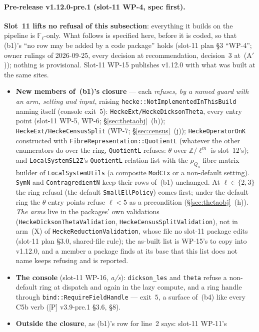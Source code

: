 \documentclass[11pt]{article}
\theoremstyle{remark}
\newcommand{\F}{\mathbb{F}}
\newcommand{\Z}{\mathbb{Z}}
\newcommand{\Fl}{\F_\ell}
\begin{document}
\paragraph{Pre-release v1.12.0-pre.1 (slot-11 WP-4, spec first).} \textbf{Slot~11 lifts no
refusal of this subsection}: everything it builds on the pipeline is $\Fl$-only. What follows is
specified here, before it is coded, so that (b1)'s ``no row may be added by a code package'' holds
(slot-11 plan \S3 ``WP-4''; owner rulings of 2026-09-25, every decision at recommendation,
decision~3 at~(A$'$)); nothing is provisional. Slot-11 WP-15 publishes v1.12.0 with what was built
at the same sites.
\begin{itemize}
\item \textbf{New members of~(b1)'s closure} --- each \emph{refuses, by a named guard with an arm,
  setting and input}, raising \texttt{hecke::NotImplementedInThisBuild} naming itself (console
  exit~$5$): \texttt{HeckeExt/HeckeDicksonTheta}, every entry point (slot-11 WP-5, WP-6;
  \S\ref{sec:thetaobj}~(h)); \texttt{HeckeExt/HeckeCensusSplit} (WP-7; \S\ref{sec:census}~(j));
  \texttt{HeckeOperatorOnK} constructed with \texttt{FibreRepresentation::QuotientL} (whatever the
  other enumerators do over the ring, \texttt{QuotientL} refuses: $\theta$ over $\Z/\ell^m$ is
  slot~12's); and \texttt{LocalSystemSL2Z}'s \texttt{QuotientL} relation list with the
  $\rho_{Q_n}$ fibre-matrix builder of \texttt{LocalSystemUtils} (a composite \texttt{ModCtx} or a
  non-default setting). \texttt{SymN} and \texttt{ContragredientN} keep their rows of~(b1)
  unchanged. At $\ell\in\{2,3\}$ the ring refusal (the default \texttt{SmallEllPolicy}) comes first;
  under the default ring the $\theta$ entry points refuse $\ell<5$ as a precondition
  (\S\ref{sec:thetaobj}~(h)). \emph{The arms} live in the packages' own validations
  (\texttt{HeckeDicksonThetaValidation}, \texttt{HeckeCensusSplitValidation}), not in arm~(X) of
  \texttt{HeckeReductionValidation}, whose file no slot-11 package edits (slot-11 plan \S3.0,
  shared-file rule); the as-built list is WP-15's to copy into v1.12.0, and a member a package
  finds at its base that this list does not name keeps refusing and is reported.
\item \textbf{The console} (slot-11 WP-16, \emph{a/s}): \texttt{dickson\_les} and \texttt{theta}
  refuse a non-default ring at dispatch and again in the lazy compute, and a ring handle through
  \texttt{bind::RequireFieldHandle} --- exit~$5$, a surface of~(b4) like every C5b verb ([P]
  v3.9-pre.1 \S3.6, \S8).
\item \textbf{Outside the closure}, as (b1)'s row for line~2 says: slot-11 WP-11's

\end{itemize}
\end{document}

